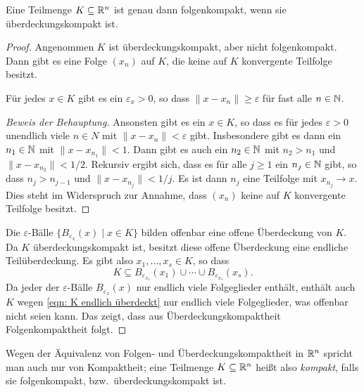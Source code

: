 \documentclass[a4paper,10pt]{article}
\begin{document}
\begin{prop}
 Eine Teilmenge $K \subseteq \mathbb{R}^n$ ist genau dann folgenkompakt, wenn sie überdeckungskompakt ist.
\end{prop}
\begin{proof}
 Angenommen $K$ ist überdeckungskompakt, aber nicht folgenkompakt. Dann gibt es eine Folge $(x_n)$ auf $K$, die keine auf $K$ konvergente Teilfolge besitzt.
 
 \begin{beh}
  Für jedes $x \in K$ gibt es ein $\varepsilon_x > 0$, so dass $\|x - x_n\| \geq \varepsilon$ für fast alle $n \in \mathbb{N}$.
 \end{beh}
 \begin{proof}[Beweis der Behauptung]
  Ansonsten gibt es ein $x \in K$, so dass es für jedes $\varepsilon > 0$ unendlich viele $n \in N$ mit $\|x - x_n\| < \varepsilon$ gibt. Insbesondere gibt es dann ein $n_1 \in \mathbb{N}$ mit $\|x - x_{n_1}\| < 1$. Dann gibt es auch ein $n_2 \in \mathbb{N}$ mit $n_2 > n_1$ und $\|x - x_{n_2}\| < 1/2$. Rekursiv ergibt sich, dass es für alle $j \geq 1$ ein $n_j \in \mathbb{N}$ gibt, so dass $n_j > n_{j-1}$ und $\|x - x_{n_j}\| < 1/j$. Es ist dann $n_j$ eine Teilfolge mit $x_{n_j} \to x$. Dies steht im Widerspruch zur Annahme, dass $(x_n)$ keine auf $K$ konvergente Teilfolge besitzt.
 \end{proof}
 
 Die $\varepsilon$-Bälle $\{B_{\varepsilon_x}(x) \mid x \in K\}$ bilden offenbar eine offene Überdeckung von $K$. Da $K$ überdeckungskompakt ist, besitzt diese offene Überdeckung eine endliche Teilüberdeckung. Es gibt also $x_1, \dotsc, x_s \in K$, so dass
 \begin{equation}\label{eqn: K endlich überdeckt}
  K \subseteq B_{\varepsilon_{x_1}}(x_1) \cup \dotsb \cup B_{\varepsilon_{x_s}}(x_s).
 \end{equation}
 Da jeder der $\varepsilon$-Bälle $B_{\varepsilon_x}(x)$ nur endlich viele Folgeglieder enthält, enthält auch $K$ wegen \eqref{eqn: K endlich überdeckt} nur endlich viele Folgeglieder, was offenbar nicht seien kann. Das zeigt, dass aus Überdeckungskompaktheit Folgenkompaktheit folgt.
\end{proof}


Wegen der Äquivalenz von Folgen- und Überdeckungskompaktheit in $\mathbb{R}^n$ spricht man auch nur von Kompaktheit; eine Teilmenge $K \subseteq \mathbb{R}^n$ heißt also \emph{kompakt}, falls sie folgenkompakt, bzw.\ überdeckungskompakt ist.
\end{document}
